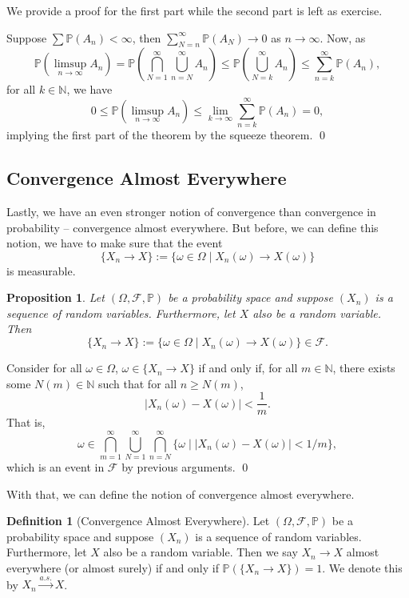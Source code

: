 \documentclass[
]{article}
\newtheorem{prop}{Proposition}[theorem]
\theoremstyle{definition}
\newtheorem{definition}{Definition}[section]
\begin{document}
We provide a proof for the first part while the second part is left as
exercise.

Suppose \(\sum \mathbb{P}(A_n) < \infty\), then
\(\sum_{N = n}^\infty \mathbb{P}(A_N) \to 0\) as \(n \to \infty\). Now,
as
\[\mathbb{P}(\limsup_{n \to \infty} A_n) = \mathbb{P}(\bigcap_{N = 1}^\infty 
    \bigcup_{n = N}^\infty A_n) \le \mathbb{P}(\bigcup_{N = k}^\infty A_n) 
    \le \sum_{n = k}^\infty \mathbb{P}(A_n),\] for all
\(k \in \mathbb{N}\), we have
\[0 \le \mathbb{P}(\limsup_{n \to \infty} A_n) \le \lim_{k \to \infty} 
    \sum_{n = k}^\infty \mathbb{P}(A_n) = 0,\] implying the first part
of the theorem by the squeeze theorem. \qed

\hypertarget{convergence-almost-everywhere}{%
\subsection{Convergence Almost
Everywhere}\label{convergence-almost-everywhere}}

Lastly, we have an even stronger notion of convergence than convergence
in probability -- convergence almost everywhere. But before, we can
define this notion, we have to make sure that the event
\[\{X_n \to X\} := \{\omega \in \Omega \mid X_n(\omega) \to X(\omega)\}\]
is measurable.

\begin{prop}
  Let \((\Omega, \mathcal{F}, \mathbb{P})\) be a probability space and suppose 
  \((X_n)\) is a sequence of random variables. Furthermore, let \(X\) also be 
  a random variable. Then 
  \[\{X_n \to X\} := \{\omega \in \Omega \mid X_n(\omega) \to X(\omega)\} \in \mathcal{F}.\]
\end{prop}
\proof

Consider for all \(\omega \in \Omega\), \(\omega \in \{X_n \to X\}\) if
and only if, for all \(m \in \mathbb{N}\), there exists some
\(N(m) \in \mathbb{N}\) such that for all \(n \ge N(m)\),
\[\left| X_n(\omega) - X(\omega) \right| < \frac{1}{m}.\] That is,
\[\omega \in \bigcap_{m = 1}^\infty \bigcup_{N = 1}^\infty \bigcap_{n = N}^\infty
    \{\omega \mid \left| X_n(\omega) - X(\omega) \right| < 1 / m \},\]
which is an event in \(\mathcal{F}\) by previous arguments. \qed

With that, we can define the notion of convergence almost everywhere.

\begin{definition}[Convergence Almost Everywhere]
  Let \((\Omega, \mathcal{F}, \mathbb{P})\) be a probability space and suppose 
  \((X_n)\) is a sequence of random variables. Furthermore, let \(X\) also be 
  a random variable. Then we say \(X_n \to X\) almost everywhere (or almost 
  surely) if and only if \(\mathbb{P}(\{X_n \to X\}) = 1\). We denote this by 
  \(X_n \xrightarrow[]{a.s.} X\).
\end{definition}
\end{document}
